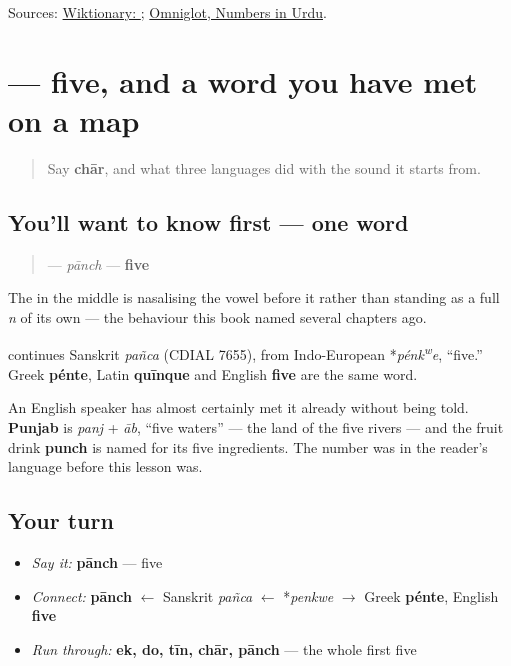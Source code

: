 \begin{tcolorbox}[breakable,colback=teal!4,colframe=teal!35!black,title={Before you move on}]
Sources: \href{https://en.wiktionary.org/wiki/\%DA\%86\%D8\%A7\%D8\%B1}{Wiktionary: }; \href{https://www.omniglot.com/language/numbers/urdu.htm}{Omniglot, Numbers in Urdu}.
\end{tcolorbox}
\section[\texorpdfstring{\ur{پانچ} (pānch)}{پانچ (pānch)}]{ — five, and a word you have met on a map}

\label{lesson:UR-C28-panch}



\begin{quote}
Say \textbf{chār}, and what three languages did with the sound it starts from.
\end{quote}

\subsection*{You'll want to know first — one word}
\begin{quote}
\textbf{} — \emph{pānch} — \textbf{five}
\end{quote}

The \textbf{} in the middle is nasalising the vowel before it rather than standing as a full \emph{n} of its own — the behaviour this book named several chapters ago.

\begin{cousinweb}
\textbf{} continues Sanskrit \emph{pañca} (CDIAL 7655), from Indo-European *\emph{pénk\textsuperscript{w}e}, \textquotedblleft{}five.\textquotedblright{} Greek \textbf{pénte}, Latin \textbf{quīnque} and English \textbf{five} are the same word.

An English speaker has almost certainly met it already without being told. \textbf{Punjab} is \emph{panj} + \emph{āb}, \textquotedblleft{}five waters\textquotedblright{} — the land of the five rivers — and the fruit drink \textbf{punch} is named for its five ingredients. The number was in the reader's language before this lesson was.
\end{cousinweb}

\subsection*{Your turn}
\begin{itemize}
\raggedright
  \item \emph{Say it:} \textbf{pānch} — five
  \item \emph{Connect:} \textbf{pānch} $\leftarrow$ Sanskrit \emph{pañca} $\leftarrow$ *\emph{penkwe} $\to$ Greek \textbf{pénte}, English \textbf{five}
  \item \emph{Run through:} \textbf{ek, do, tīn, chār, pānch} — the whole first five
\end{itemize}

